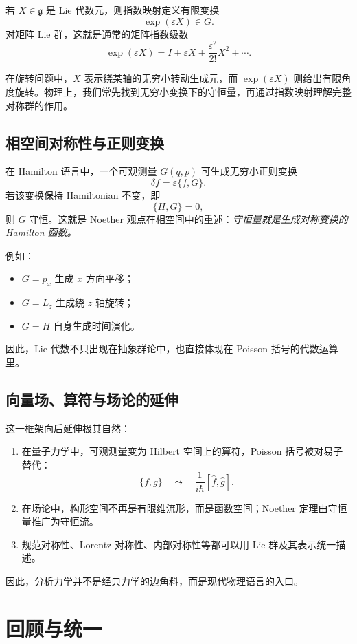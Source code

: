 若 $X\in \mathfrak g$ 是 Lie 代数元，则指数映射定义有限变换
\[
  \exp(\varepsilon X)\in G.
\]
对矩阵 Lie 群，这就是通常的矩阵指数级数
\[
  \exp(\varepsilon X)=I+\varepsilon X+\frac{\varepsilon^2}{2!}X^2+\cdots.
\]

在旋转问题中，$X$ 表示绕某轴的无穷小转动生成元，而 $\exp(\varepsilon X)$ 则给出有限角度旋转。物理上，我们常先找到无穷小变换下的守恒量，再通过指数映射理解完整对称群的作用。

\subsection{相空间对称性与正则变换}

在 Hamilton 语言中，一个可观测量 $G(q,p)$ 可生成无穷小正则变换
\[
  \delta f = \varepsilon\{f,G\}.
\]
若该变换保持 Hamiltonian 不变，即
\[
  \{H,G\}=0,
\]
则 $G$ 守恒。这就是 Noether 观点在相空间中的重述：\emph{守恒量就是生成对称变换的 Hamilton 函数。}

例如：
\begin{itemize}
  \item $G=p_x$ 生成 $x$ 方向平移；
  \item $G=L_z$ 生成绕 $z$ 轴旋转；
  \item $G=H$ 自身生成时间演化。
\end{itemize}

因此，Lie 代数不只出现在抽象群论中，也直接体现在 Poisson 括号的代数运算里。

\subsection{向量场、算符与场论的延伸}

这一框架向后延伸极其自然：
\begin{enumerate}
  \item 在量子力学中，可观测量变为 Hilbert 空间上的算符，Poisson 括号被对易子替代：
  \[
    \{f,g\}\quad \leadsto\quad \frac{1}{i\hbar}[\hat f,\hat g].
  \]
  \item 在场论中，构形空间不再是有限维流形，而是函数空间；Noether 定理由守恒量推广为守恒流。
  \item 规范对称性、Lorentz 对称性、内部对称性等都可以用 Lie 群及其表示统一描述。
\end{enumerate}

因此，分析力学并不是经典力学的边角料，而是现代物理语言的入口。

\section{回顾与统一}

